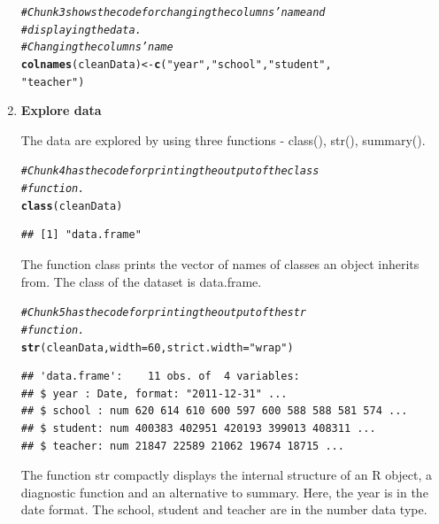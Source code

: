 \documentclass{article}\usepackage[]{graphicx}\usepackage[]{color}
\makeatletter
\newcommand{\hlnum}[1]{\textcolor[rgb]{0.686,0.059,0.569}{#1}}%
\newcommand{\hlstr}[1]{\textcolor[rgb]{0.192,0.494,0.8}{#1}}%
\newcommand{\hlcom}[1]{\textcolor[rgb]{0.678,0.584,0.686}{\textit{#1}}}%
\newcommand{\hlstd}[1]{\textcolor[rgb]{0.345,0.345,0.345}{#1}}%
\newcommand{\hlkwb}[1]{\textcolor[rgb]{0.69,0.353,0.396}{#1}}%
\newcommand{\hlkwc}[1]{\textcolor[rgb]{0.333,0.667,0.333}{#1}}%
\newcommand{\hlkwd}[1]{\textcolor[rgb]{0.737,0.353,0.396}{\textbf{#1}}}%
\newenvironment{kframe}{%
 \def\at@end@of@kframe{}%
 \ifinner\ifhmode%
  \def\at@end@of@kframe{\end{minipage}}%
  \begin{minipage}{\columnwidth}%
 \fi\fi%
 \def\FrameCommand##1{\hskip\@totalleftmargin \hskip-\fboxsep
 \colorbox{shadecolor}{##1}\hskip-\fboxsep
     \hskip-\linewidth \hskip-\@totalleftmargin \hskip\columnwidth}%
 \MakeFramed {\advance\hsize-\width
   \@totalleftmargin\z@ \linewidth\hsize
   \@setminipage}}%
 {\par\unskip\endMakeFramed%
 \at@end@of@kframe}
\newenvironment{knitrout}{}{} %
\makeatother
\begin{document}
\begin{enumerate}
\begin{knitrout}
\color{fgcolor}\begin{kframe}
\begin{alltt}
\hlcom{# Chunk3 shows the code for changing the columns' name and }
\hlcom{# displaying the data.}
\hlcom{# Changing the columns' name}
\hlkwd{colnames}\hlstd{(cleanData)} \hlkwb{<-} \hlkwd{c}\hlstd{(}\hlstr{"year"}\hlstd{,} \hlstr{"school"}\hlstd{,} \hlstr{"student"}\hlstd{,}
                         \hlstr{"teacher"}\hlstd{)}
\end{alltt}
\end{kframe}
\end{knitrout}
\item \textbf{Explore data}

The data are explored by using three functions - class(), str(), summary().

\begin{knitrout}
\color{fgcolor}\begin{kframe}
\begin{alltt}
\hlcom{# Chunk4 has the code for printing the output of the class }
\hlcom{# function.}
\hlkwd{class}\hlstd{(cleanData)}
\end{alltt}
\begin{verbatim}
## [1] "data.frame"
\end{verbatim}
\end{kframe}
\end{knitrout}

The function class prints the vector of names of classes an object inherits from. The class of the dataset is data.frame.

\begin{knitrout}
\color{fgcolor}\begin{kframe}
\begin{alltt}
\hlcom{# Chunk5 has the code for printing the output of the str }
\hlcom{# function.}
\hlkwd{str}\hlstd{(cleanData,} \hlkwc{width}\hlstd{=}\hlnum{60}\hlstd{,} \hlkwc{strict.width}\hlstd{=}\hlstr{"wrap"}\hlstd{)}
\end{alltt}
\begin{verbatim}
## 'data.frame':	11 obs. of  4 variables:
## $ year : Date, format: "2011-12-31" ...
## $ school : num 620 614 610 600 597 600 588 588 581 574 ...
## $ student: num 400383 402951 420193 399013 408311 ...
## $ teacher: num 21847 22589 21062 19674 18715 ...
\end{verbatim}
\end{kframe}
\end{knitrout}
The function str compactly displays the internal structure of an R object, a diagnostic function and an alternative to summary. Here, the year is in the date format. The school, student and teacher are in the number data type.


\end{enumerate}
\end{document}
